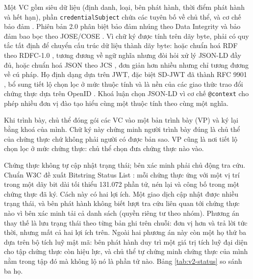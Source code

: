 Một VC gồm siêu dữ liệu (định danh, loại, bên phát hành, thời điểm phát hành và hết hạn), phần \texttt{credentialSubject} chứa các tuyên bố về chủ thể, và cơ chế bảo đảm \cite{W3C_VCDM2025}. Phiên bản 2.0 phân biệt bảo đảm nhúng theo Data Integrity \cite{W3C_VCDataIntegrity2025} và bảo đảm bao bọc theo JOSE/COSE \cite{W3C_VCJOSECOSE2025}. Vì chữ ký được tính trên dãy byte, phải có quy tắc tất định để chuyển cấu trúc dữ liệu thành dãy byte: hoặc chuẩn hoá RDF theo RDFC-1.0 \cite{W3C_RDFC2024}, tương đương về ngữ nghĩa nhưng đòi hỏi xử lý JSON-LD đầy đủ, hoặc chuẩn hoá JSON theo JCS \cite{RFC8785}, đơn giản hơn nhiều nhưng chỉ tương đương về cú pháp. Họ định dạng dựa trên JWT, đặc biệt SD-JWT đã thành RFC 9901 \cite{RFC9901}, bổ sung tiết lộ chọn lọc ở mức thuộc tính và là nền của các giao thức trao đổi chứng thực dựa trên OpenID \cite{OpenID4VP2025}. Khoá luận chọn JSON-LD \cite{W3C_JSONLD2020} vì cơ chế \texttt{@context} cho phép nhiều đơn vị đào tạo hiểu cùng một thuộc tính theo cùng một nghĩa.

Khi trình bày, chủ thể đóng gói các VC vào một bản trình bày (VP) và ký lại bằng khoá của mình. Chữ ký này chứng minh người trình bày đúng là chủ thể của chứng thực chứ không phải người có được bản sao. VP cũng là nơi tiết lộ chọn lọc ở mức chứng thực: chủ thể chọn đưa chứng thực nào vào.

Chứng thực không tự cập nhật trạng thái; bên xác minh phải chủ động tra cứu. Chuẩn W3C đề xuất Bitstring Status List \cite{W3C_BitstringStatusList2025}: mỗi chứng thực ứng với một vị trí trong một dãy bit dài tối thiểu 131.072 phần tử, nén lại và công bố trong một chứng thực đã ký. Cách này có hai lợi ích. Một giao dịch cập nhật được nhiều trạng thái, và bên phát hành không biết lượt tra cứu liên quan tới chứng thực nào vì bên xác minh tải cả danh sách (quyền riêng tư theo nhóm). Phương án thay thế là lưu trạng thái theo từng bản ghi trên chuỗi: đơn vị hơn và trả lời tức thời, nhưng mất cả hai lợi ích trên. Ngoài hai phương án này còn một họ thứ ba dựa trên bộ tích luỹ mật mã: bên phát hành duy trì một giá trị tích luỹ đại diện cho tập chứng thực còn hiệu lực, và chủ thể tự chứng minh chứng thực của mình nằm trong tập đó mà không lộ nó là phần tử nào. Bảng \ref{tab:v2-status} so sánh ba họ.

